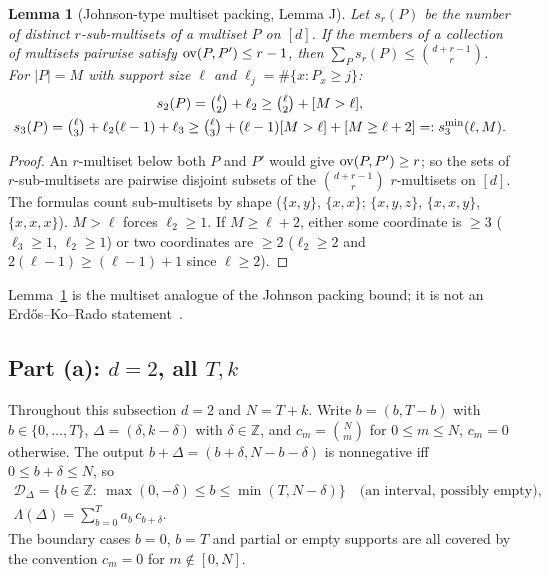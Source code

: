 \documentclass[11pt]{article}
\newcommand{\Z}{\mathbb{Z}}
\newtheorem{lemma}[theorem]{Lemma}
\theoremstyle{definition}
\theoremstyle{remark}
\begin{document}
\begin{lemma}[Johnson-type multiset packing, Lemma J]\label{lem:J}
Let $s_r(P)$ be the number of distinct $r$-sub-multisets of a multiset $P$ on $[d]$. If the members of a collection of multisets pairwise
satisfy $\mathrm{ov}(P,P')\le r-1$, then $\sum_Ps_r(P)\le\binom{d+r-1}{r}$. For $|P|=M$ with support size $\ell$ and $\ell_j=\#\{x:P_x\ge j\}$:
\begin{gather*}
s_2(P)=\tbinom\ell2+\ell_2\ge\tbinom\ell2+[M>\ell],\\
s_3(P)=\tbinom\ell3+\ell_2(\ell-1)+\ell_3\ge\tbinom\ell3+(\ell-1)[M>\ell]+[M\ge\ell+2]=:s_3^{\min}(\ell,M).
\end{gather*}
\end{lemma}
\begin{proof}
An $r$-multiset below both $P$ and $P'$ would give $\mathrm{ov}(P,P')\ge r$; so the sets of $r$-sub-multisets are pairwise disjoint subsets of the
$\binom{d+r-1}r$ $r$-multisets on $[d]$. The formulas count sub-multisets by shape ($\{x,y\}$, $\{x,x\}$; $\{x,y,z\}$, $\{x,x,y\}$,
$\{x,x,x\}$). $M>\ell$ forces $\ell_2\ge1$. If $M\ge\ell+2$, either some coordinate is $\ge3$ ($\ell_3\ge1$, $\ell_2\ge1$) or two coordinates
are $\ge2$ ($\ell_2\ge2$ and $2(\ell-1)\ge(\ell-1)+1$ since $\ell\ge2$).
\end{proof}
Lemma~\ref{lem:J} is the multiset analogue of the Johnson packing bound; it is not an Erd\H{o}s--Ko--Rado statement~\cite{MeagherPurdy2011}.

\subsection{Part (a): \texorpdfstring{$d=2$}{d=2}, all \texorpdfstring{$T,k$}{T,k}}\label{app:d2}
Throughout this subsection $d=2$ and $N=T+k$. Write $b=(b,T-b)$ with $b\in\{0,\dots,T\}$, $\Delta=(\delta,k-\delta)$ with $\delta\in\Z$, and
$c_m=\binom Nm$ for $0\le m\le N$, $c_m=0$ otherwise. The output $b+\Delta=(b+\delta,N-b-\delta)$ is nonnegative iff $0\le b+\delta\le N$, so
\begin{gather*}
\mathcal D_\Delta=\{b\in\Z:\ \max(0,-\delta)\le b\le\min(T,N-\delta)\}\quad\text{(an interval, possibly empty)},\\
\Lambda(\Delta)=\sum_{b=0}^Ta_b\,c_{b+\delta}.
\end{gather*}
The boundary cases $b=0$, $b=T$ and partial or empty supports are all covered by the convention $c_m=0$ for $m\notin[0,N]$.
\end{document}

